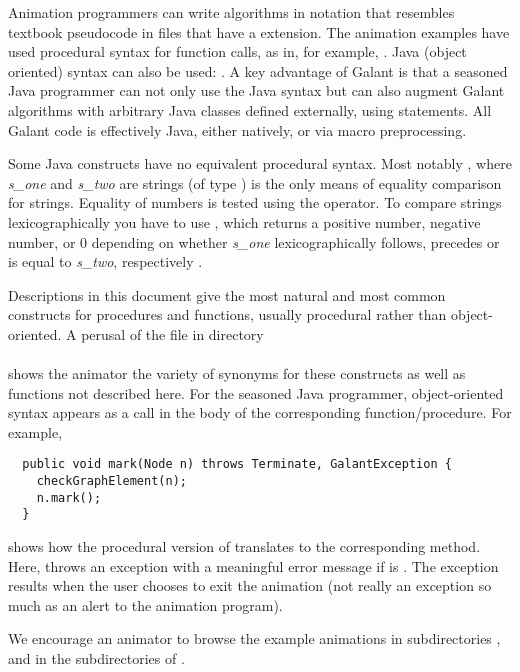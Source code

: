 Animation programmers can write algorithms in notation that resembles
textbook pseudocode
in files that have a  extension.
The animation examples have used procedural syntax for function calls, as in, for example,
.
Java (object oriented) syntax can also be used: .
A key advantage of Galant is that a seasoned Java programmer can
not only use the Java syntax but can also augment Galant algorithms with
arbitrary Java classes defined externally, using  statements.
All Galant code is effectively Java, either natively, or via macro
preprocessing.

Some Java constructs have no equivalent procedural syntax. Most notably
, where \emph{s\_one} and
\emph{s\_two} are strings (of type ) is the only means of
equality comparison for strings. Equality of numbers is tested using the
\Code{==} operator.
To compare strings lexicographically you have to use
, which returns a positive
number, negative number, or 0 depending on whether \emph{s\_one}
lexicographically follows,
precedes or is equal to \emph{s\_two}, respectively .

Descriptions in this document give the most natural and most common
constructs for procedures and functions, usually procedural rather
than object-oriented.
A perusal of the file  in directory\\ 
\\
shows the animator the variety of
synonyms for these constructs
as well as functions not described here. For the seasoned Java programmer,
object-oriented syntax appears as a call in the body of the corresponding
function/procedure. For example,
\begin{verbatim}
  public void mark(Node n) throws Terminate, GalantException {
    checkGraphElement(n);
    n.mark();
  }
\end{verbatim}
shows how the procedural version of  translates to the
corresponding  method. Here,  throws an
exception with a meaningful error message if  is .
The  exception results when the user chooses to exit the
animation (not really an exception so much as an alert to the animation
program).

We encourage an animator to browse the example animations in subdirectories
,  and in the subdirectories of .

